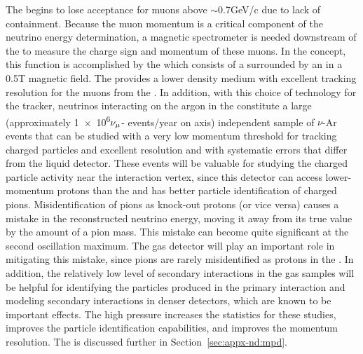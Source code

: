 The  begins to lose acceptance for muons above $\sim$\num{0.7}{GeV/c} due to lack of containment. Because the muon momentum is a critical component of the neutrino energy determination, a magnetic spectrometer is needed downstream of the  to measure the charge sign and momentum of these muons. In the   concept, this function is accomplished by the  which consists of a  surrounded by an  in a \num{0.5}{T} magnetic field. The  provides a lower density medium with excellent tracking resolution for the muons from the . In addition, with this choice of technology for the tracker, neutrinos interacting on the argon in the  constitute a large (approximately \num{1e6}$\nu_\mu$- events/year on axis) independent sample of $\nu$-Ar events that can be studied with a very low momentum threshold for tracking charged particles and excellent resolution and with systematic errors that differ from the liquid detector. These events will be valuable for studying the charged particle activity near the interaction vertex, since this detector can access lower-momentum protons than the  and has better particle identification of charged pions.  Misidentification of pions as knock-out protons (or vice versa) causes a mistake in the reconstructed neutrino energy, moving it away from its true value by the amount of a pion mass.  This mistake can become quite significant at the second oscillation maximum. The gas detector will play an important role in mitigating this mistake, since pions are rarely misidentified as protons in the .  In addition, the relatively low level of secondary interactions in the gas samples will be helpful for identifying the particles produced in the primary interaction and modeling secondary interactions in denser detectors, which are known to be important effects\cite{Friedland:2018vry}. The high pressure increases the statistics for these studies, improves the particle identification capabilities, and improves the momentum resolution. 
The  is discussed further in Section~\ref{sec:appx-nd:mpd}.



